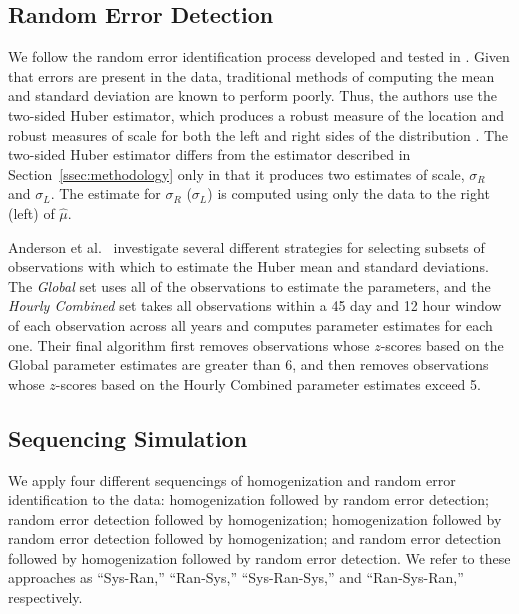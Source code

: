 \documentclass[12pt]{article}
\begin{document}
\begin{doublespacing}
\subsection{Random Error Detection}
\label{sec:ranErr}
We follow the random error identification process developed and tested in \cite{bell14}.  Given that errors are present in the data, traditional methods of computing the mean and standard deviation are known to perform poorly.  Thus, the authors use the two-sided Huber estimator, which produces a robust measure of the location and robust measures of scale for both the left and right sides of the distribution \cite{huber11}.  The two-sided Huber estimator differs from the estimator described in Section~\ref{ssec:methodology} only in that it produces two estimates of scale, $\sigma_R$ and $\sigma_L$.  The estimate for $\sigma_R$ ($\sigma_L$) is computed using only the data to the right (left) of $\hat{\mu}$.

Anderson et al.~\cite{bell14} investigate several different strategies for selecting subsets of observations with which to estimate the Huber mean and standard deviations.  The \emph{Global} set uses all of the observations to estimate the parameters, and the \emph{Hourly Combined} set takes all observations within  a 45 day and 12 hour window of each observation across all years and computes parameter estimates for each one.  Their final algorithm first removes observations whose $z$-scores based on the Global parameter estimates are greater than 6, and then removes observations whose $z$-scores  based on the Hourly Combined parameter estimates exceed 5.  


\subsection{Sequencing Simulation}

We apply four different sequencings of homogenization and random error identification to the data: homogenization followed by random error detection; random error detection followed by homogenization; homogenization followed by random error detection followed by homogenization; and random error detection followed by homogenization followed by random error detection.  We refer to these approaches as ``Sys-Ran,'' ``Ran-Sys,'' ``Sys-Ran-Sys,'' and ``Ran-Sys-Ran,'' respectively.


\end{doublespacing}
\end{document}
